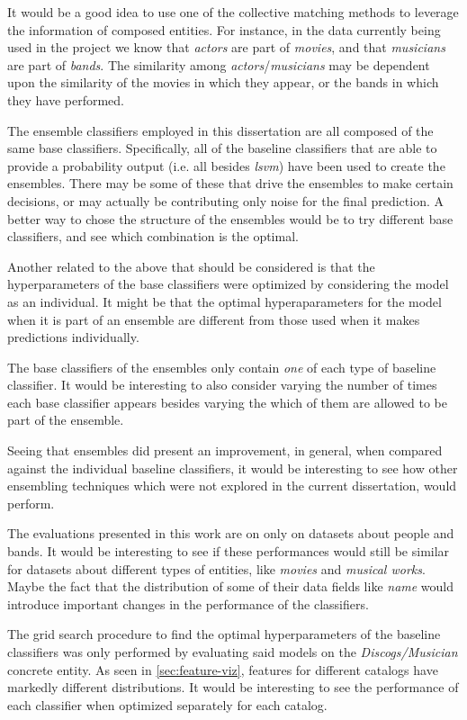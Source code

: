\documentclass[epsfig,a4paper,11pt,titlepage,twoside,openany]{book}
\begin{document}
It would be a good idea to use one of the collective matching methods to leverage the information of composed entities. For instance, in the data currently being used in the project we know that \textit{actors} are part of \textit{movies}, and that \textit{musicians} are part of \textit{bands}. The similarity among \textit{actors}/\textit{musicians} may be dependent upon the similarity of the movies in which they appear, or the bands in which they have performed.

The ensemble classifiers employed in this dissertation are all composed of the same base classifiers. Specifically, all of the baseline classifiers that are able to provide a probability output (i.e. all besides \textit{lsvm}) have been used to create the ensembles. There may be some of these that drive the ensembles to make certain decisions, or may actually be contributing only noise for the final prediction. A better way to chose the structure of the ensembles would be to try different base classifiers, and see which combination is the optimal. 

Another related to the above that should be considered is that the hyperparameters of the base classifiers were optimized by considering the model as an individual. It might be that the optimal hyperaparameters for the model when it is part of an ensemble are different from those used when it makes predictions individually. 

The base classifiers of the ensembles only contain \textit{one} of each type of baseline classifier. It would be interesting to also consider varying the number of times each base classifier appears besides varying the which of them are allowed to be part of the ensemble. 

Seeing that ensembles did present an improvement, in general, when compared against the individual baseline classifiers, it would be interesting to see how other ensembling techniques which were not explored in the current dissertation, would perform.

The evaluations presented in this work are on only on datasets about people and bands. It would be interesting to see if these performances would still be similar for datasets about different types of entities, like \textit{movies} and \textit{musical works}. Maybe the fact that the distribution of some of their data fields like \textit{name} would introduce important changes in the performance of the classifiers. 

The grid search procedure to find the optimal hyperparameters of the baseline classifiers was only performed by evaluating said models on the \textit{Discogs/Musician} concrete entity. As seen in \autoref{sec:feature-viz}, features for different catalogs have markedly different distributions. It would be interesting to see the performance of each classifier when optimized separately for each catalog. 
\end{document}
